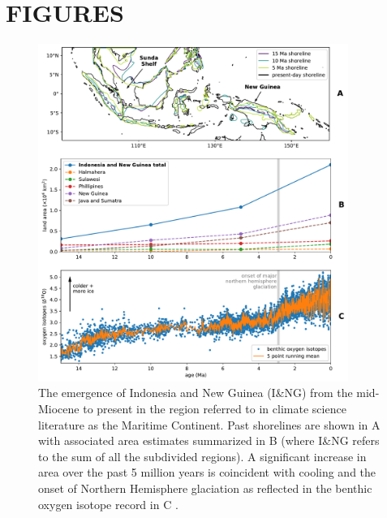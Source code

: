 \documentclass[11pt,letterpaper]{article}
\begin{document}
\clearpage
\newpage

\section*{FIGURES}

\begin{figure}[h!]
    \centering
    \includegraphics[width=0.9\textwidth]{Figures/shoreline_growth.pdf}
    \caption{The emergence of Indonesia and New Guinea (I\&NG) from the mid-Miocene to present in the region referred to in climate science literature as the Maritime Continent. Past shorelines are shown in A with associated area estimates summarized in B (where I\&NG refers to the sum of all the subdivided regions). A significant increase in area over the past 5 million years is coincident with cooling and the onset of Northern Hemisphere glaciation as reflected in the benthic oxygen isotope record in C \cite{Zachos2008a}.}
    \label{fig:shoreline_growth}
\end{figure}
\end{document}
